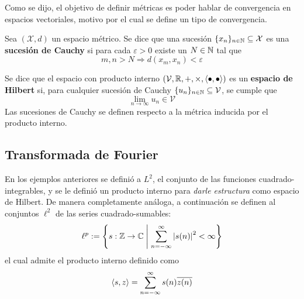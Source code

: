 Como se dijo, el objetivo de definir métricas es poder hablar de convergencia en espacios vectoriales, motivo por el cual se define un tipo de convergencia.

\begin{definicion}
Sea $(\mathcal{X},d)$ un espacio métrico. Se dice que una sucesión $\{x_n\}_{n\in \mathbb{N}} \subseteq \mathcal{X}$ es una \textbf{sucesión de Cauchy} si para cada $\varepsilon > 0$ existe un $N \in \mathbb{N}$ tal que
\begin{equation}
m, n > N \Rightarrow d(x_m, x_n) < \varepsilon
\end{equation}
\end{definicion}

\begin{definicion}
Se dice que el espacio con producto interno $(\mathcal{V},\mathbb{R},+,\times, \left\langle \bullet,\bullet \right\rangle)$ es un \textbf{espacio de Hilbert} si, para cualquier sucesión de Cauchy $\{u_n\}_{n\in \mathbb{N}} \subseteq \mathcal{V}$, se cumple que
\begin{equation}
\lim_{n\rightarrow\infty} u_n \in \mathcal{V}
\end{equation}
Las sucesiones de Cauchy se definen respecto a la métrica inducida por el producto interno.
\end{definicion}

%


\subsection{Transformada de Fourier}
\label{sec:fourier1}

En los ejemplos anteriores se definió a $L^{2}$, el conjunto de las funciones cuadrado-integrables, y se le definió un producto interno para \textit{darle estructura} como espacio de Hilbert.
%
De manera completamente análoga, a continuación se definen al conjuntos $\ell^{2}$ de las series cuadrado-sumables:
\begin{equation}
\ell^{p} := \left\{ s: \mathbb{Z}\rightarrow\mathbb{C} \mathrel{}\middle|\mathrel{} \sum_{n=-\infty}^{\infty} \left| s(n) \right|^{2} < \infty \right\}
\end{equation}
el cual admite el producto interno definido como
\begin{equation}
\left\langle s,z \right\rangle = \sum_{n=-\infty}^{\infty} s(n) \overline{z(n)}\\
\end{equation}

